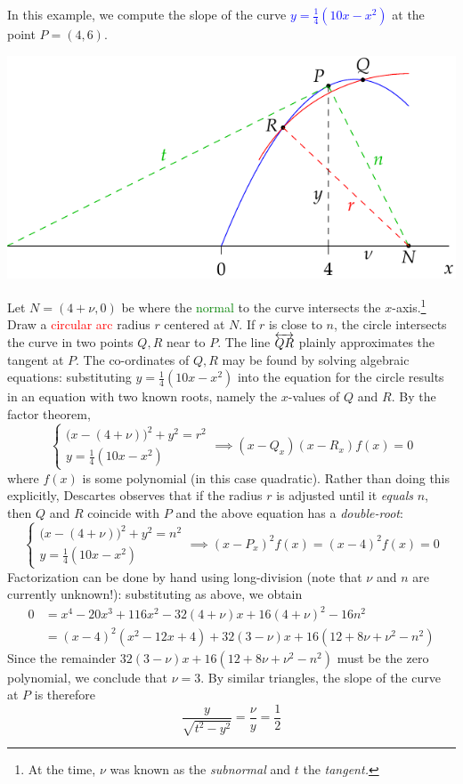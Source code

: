 In this example, we compute the slope of the curve \textcolor{blue}{$y=\frac 14(10x-x^2)$} at the point $P=(4,6)$.
\begin{center}
\includegraphics[scale=0.9]{analytic-desnormal}
\end{center}
Let $N=(4+\nu,0)$ be where the \textcolor{Green}{normal} to the curve intersects the $x$-axis.\footnote{At the time, $\nu$ was known as the \emph{subnormal} and $t$ the \emph{tangent.}} Draw a \textcolor{red}{circular arc} radius $r$ centered at $N$.
If $r$ is close to $n$, the circle intersects the curve in two points $Q,R$ near to $P$. The line $\overleftrightarrow{QR}$ plainly approximates the tangent at $P$.
\smallbreak
The co-ordinates of $Q,R$ may be found by solving algebraic equations: substituting $y=\frac 14(10x-x^2)$ into the equation for the circle results in an equation with two known roots, namely the $x$-values of $Q$ and $R$. By the factor theorem,
\[\begin{cases}
\bigl(x-(4+\nu)\bigr)^2+y^2=r^2\\
y=\frac 14(10x-x^2)
\end{cases} \implies (x-Q_x)(x-R_x)f(x)=0\]
where $f(x)$ is some polynomial (in this case quadratic). Rather than doing this explicitly, Descartes observes that if the radius $r$ is adjusted until it \emph{equals} $n$, then $Q$ and $R$ coincide with $P$ and the above equation has a \emph{double-root}:
\[\begin{cases}
\bigl(x-(4+\nu)\bigr)^2+y^2=n^2\\
y=\frac 14(10x-x^2)
\end{cases} \implies (x-P_x)^2f(x)=(x-4)^2f(x)=0\]
Factorization can be done by hand using long-division (note that $\nu$ and $n$ are currently unknown!): substituting as above, we obtain
\begin{align*}
0&=x^4-20x^3+116x^2-32(4+\nu)x+16(4+\nu)^2-16n^2\\
&=(x-4)^2(x^2-12x+4)+32(3-\nu)x+16(12+8\nu+\nu^2-n^2)
\end{align*}
Since the remainder $32(3-\nu)x+16(12+8\nu+\nu^2-n^2)$ must be the zero polynomial, we conclude that $\nu=3$.
By similar triangles, the slope of the curve at $P$ is therefore
\[\frac y{\sqrt{t^2-y^2}}=\frac\nu y=\frac 12\]
\goodbreak

